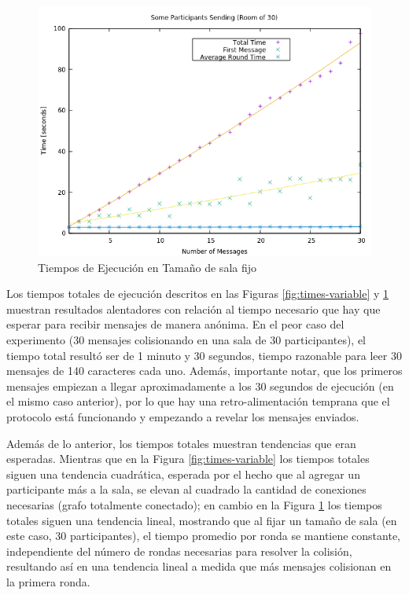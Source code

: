 \begin{figure}[H]
  \centering
    \includegraphics[scale=0.7]{logs/logs_partial_30/times.png}
  \caption{Tiempos de Ejecución en Tamaño de sala fijo}
  \label{fig:times-fixed}
\end{figure}

Los tiempos totales de ejecución descritos en las Figuras 
\ref{fig:times-variable} y \ref{fig:times-fixed} 
muestran resultados alentadores con relación al tiempo necesario que hay 
que esperar para recibir mensajes de manera anónima. En el peor caso del 
experimento (30 mensajes colisionando en una sala de 30 participantes), el 
tiempo total resultó ser de 1 minuto y 30 segundos, tiempo razonable para 
leer 30 mensajes de 140 caracteres cada uno. Además, importante notar, que 
los primeros mensajes empiezan a llegar aproximadamente a los 30 segundos 
de ejecución (en el mismo caso anterior), por lo que hay una 
retro-alimentación temprana que el protocolo está funcionando y empezando a 
revelar los mensajes enviados.

Además de lo anterior, los tiempos totales muestran 
tendencias que eran esperadas. Mientras que en la Figura 
\ref{fig:times-variable} los tiempos totales siguen una tendencia 
cuadrática, esperada por el hecho que al agregar un participante más a la 
sala, se elevan al cuadrado la cantidad de conexiones necesarias (grafo 
totalmente conectado); en cambio en la Figura \ref{fig:times-fixed} 
los tiempos totales siguen una tendencia lineal, mostrando que al fijar un 
tamaño de sala (en este caso, 30 participantes), el tiempo promedio por ronda 
se mantiene constante, independiente del número de rondas necesarias para 
resolver la colisión, resultando así en una tendencia lineal a medida que 
más mensajes colisionan en la primera ronda.

